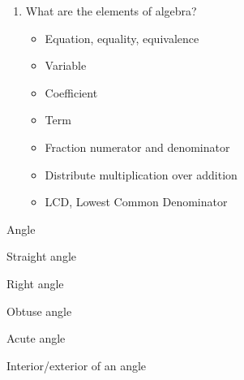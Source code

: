 \begin{enumerate}
\item What are the elements of algebra?
\begin{itemize}
    \item Equation, equality, equivalence
    \item Variable
    \item Coefficient
    \item Term
    \item Fraction numerator and denominator
    \item Distribute multiplication over addition
    \item LCD, Lowest Common Denominator
\end{itemize}
  
\end{enumerate}


\item Angle
\item Straight angle
\item Right angle
\item Obtuse angle
\item Acute angle
\item Interior/exterior of an angle